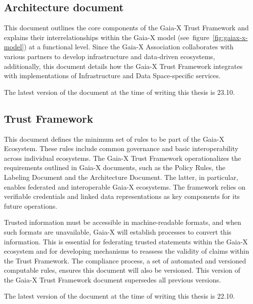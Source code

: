 \subsection{Architecture document}\label{subsec:architecture-document}

This document outlines the core components of the Gaia-X Trust Framework and explains their interrelationships within the Gaia-X model (see~figure~\ref{fig:gaiax-x-model}) at a functional level\cite{gaiax_architecture_document}.
Since the Gaia-X Association collaborates with various partners to develop infrastructure and data-driven ecosystems, additionally, this document details how the Gaia-X Trust Framework integrates with implementations of Infrastructure and Data Space-specific services.

The latest version of the document at the time of writing this thesis is 23.10.

\subsection{Trust Framework}\label{subsec:trust-framework}

This document defines the minimum set of rules to be part of the Gaia-X Ecosystem\cite{gaiax_trust_framework}.
These rules include common governance and basic interoperability across individual ecosystems.
The Gaia-X Trust Framework operationalizes the requirements outlined in Gaia-X documents, such as the Policy Rules, the Labeling Document and the Architecture Document. %
The latter, in particular, enables federated and interoperable Gaia-X ecosystems.
The framework relies on verifiable credentials and linked data representations as key components for its future operations.

Trusted information must be accessible in machine-readable formats, and when such formats are unavailable, Gaia-X will establish processes to convert this information.
This is essential for federating trusted statements within the Gaia-X ecosystem and for developing mechanisms to reassess the validity of claims within the Trust Framework.
The compliance process, a set of automated and versioned computable rules, ensures this document will also be versioned.
This version of the Gaia-X Trust Framework document supersedes all previous versions.

The latest version of the document at the time of writing this thesis is 22.10.


